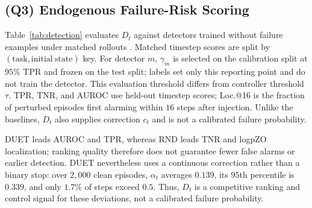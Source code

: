 \documentclass[letterpaper, 10 pt, conference]{ieeeconf}
\begin{document}
\subsection{\textbf{(Q3)} Endogenous Failure-Risk Scoring}
\label{sec:detection}
Table~\ref{tab:detection} evaluates $D_t$ against detectors trained without failure examples under matched rollouts \cite{faildetect,sentinel}. Matched timestep scores are split by $(\mathrm{task},\mathrm{initial\ state})$ key. For detector $m$, $\gamma_m$ is selected on the calibration split at $95\%$ TPR and frozen on the test split; labels set only this reporting point and do not train the detector. This evaluation threshold differs from controller threshold $\tau$. TPR, TNR, and AUROC use held-out timestep scores; Loc.@16 is the fraction of perturbed episodes first alarming within $16$ steps after injection. Unlike the baselines, $D_t$ also supplies correction $c_t$ and is not a calibrated failure probability.

\begin{table}[t]
\caption{Matched-protocol failure-risk scoring. Higher is better; column bests in bold.}
\label{tab:detection}
\centering
{}
\end{table}

DUET leads AUROC and TPR, whereas RND leads TNR and logpZO localization; ranking quality therefore does not guarantee fewer false alarms or earlier detection. DUET nevertheless uses a continuous correction rather than a binary stop: over $2{,}000$ clean episodes, $\alpha_t$ averages $0.139$, its $95$th percentile is $0.339$, and only $1.7\%$ of steps exceed $0.5$. Thus, $D_t$ is a competitive ranking and control signal for these deviations, not a calibrated failure probability.
\end{document}
